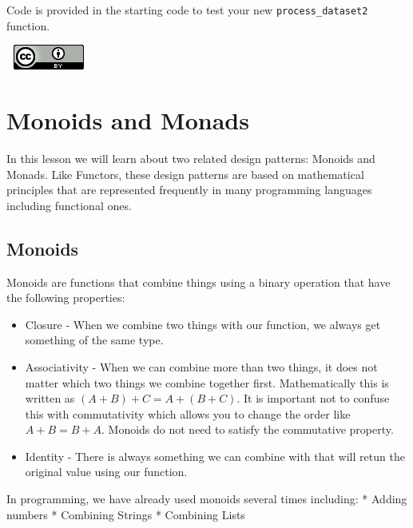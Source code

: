 \documentclass[
]{book}
\providecommand{\tightlist}{%
  \setlength{\itemsep}{0pt}\setlength{\parskip}{0pt}}
\begin{document}
\begin{problembox}
\begin{enumerate}
  Code is provided in the starting code to test your new \texttt{process\_dataset2} function.
\end{enumerate}

\end{problembox}

\(\nonumber\)
\(\nonumber\)
\href{http://creativecommons.org/licenses/by/4.0/}{\includegraphics{images/cc-88x31.png}}

\hypertarget{monoids-and-monads}{%
\chapter{Monoids and Monads}\label{monoids-and-monads}}

In this lesson we will learn about two related design patterns: Monoids and Monads. Like Functors, these design patterns are based on mathematical principles that are represented frequently in many programming languages including functional ones.

\hypertarget{monoids}{%
\section{Monoids}\label{monoids}}

Monoids are functions that combine things using a binary operation that have the following properties:

\begin{itemize}
\tightlist
\item
  Closure - When we combine two things with our function, we always get something of the same type.
\item
  Associativity - When we can combine more than two things, it does not matter which two things we combine together first. Mathematically this is written as \((A + B) + C = A + (B + C)\). It is important not to confuse this with commutativity which allows you to change the order like \(A + B = B + A\). Monoids do not need to satisfy the commutative property.\\
\item
  Identity - There is always something we can combine with that will retun the original value using our function.
\end{itemize}

In programming, we have already used monoids several times including:
* Adding numbers
* Combining Strings
* Combining Lists
\end{document}
